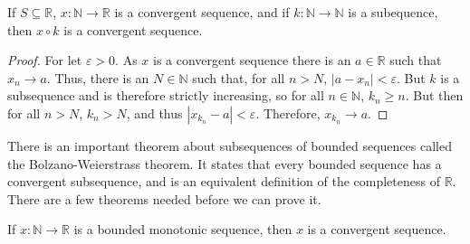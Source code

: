 \documentclass[crop=false,class=book,oneside]{standalone}
\begin{document}
            \begin{theorem}
                If $S\subseteq\mathbb{R}$,
                $x:\mathbb{N}\rightarrow\mathbb{R}$ is a
                convergent sequence, and if
                $k:\mathbb{N}\rightarrow\mathbb{N}$ is a
                subequence, then $x\circ{k}$ is a convergent
                sequence.
            \end{theorem}
            \begin{proof}
                For let $\varepsilon>0$.
                As $x$ is a convergent sequence there is
                an $a\in\mathbb{R}$ such that
                $x_{n}\rightarrow{a}$. Thus, there is an
                $N\in\mathbb{N}$ such that, for all
                $n>N$, $|a-x_{n}|<\varepsilon$. But
                $k$ is a subsequence and is therefore
                strictly increasing, so
                for all $n\in\mathbb{N}$, $k_{n}\geq{n}$.
                But then for all $n>N$, $k_{n}>N$, and thus
                $|x_{k_{n}}-a|<\varepsilon$. Therefore,
                $x_{k_{n}}\rightarrow{a}$.
            \end{proof}
            There is an important theorem about
            subsequences of bounded sequences called the
            Bolzano-Weierstrass theorem. It states that
            every bounded sequence has a convergent subsequence,
            and is an equivalent definition of the
            completeness of $\mathbb{R}$. There are a few theorems
            needed before we can prove it.
            \begin{theorem}
                \label{th:funct:bounded_monotone_%
                       sequences_converge}
                If $x:\mathbb{N}\rightarrow\mathbb{R}$
                is a bounded monotonic sequence,
                then $x$ is a convergent sequence.
            \end{theorem}
\end{document}
